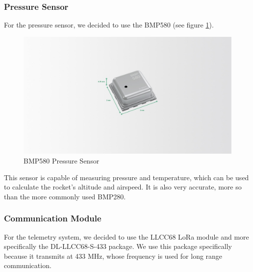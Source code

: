 \documentclass{article}
\begin{document}
\subsubsection*{Pressure Sensor}
For the pressure sensor, we decided to use the BMP580 (see figure \ref{fig:bmp580}).
\begin{figure}[p]
      \caption{BMP580 Pressure Sensor\cite{BMP580}}
      \label{fig:bmp580}
      \centering
      \includegraphics[width=\textwidth]{bmp580.jpg}
\end{figure}This sensor is capable of measuring pressure and temperature, which can be used to calculate the rocket's altitude and airspeed. It is also very accurate, more so than the more commonly used BMP280. \cite{Bosch_Sensortec_2024}

\subsubsection{Communication Module}
For the telemetry system, we decided to use the LLCC68 LoRa module and more specifically the DL-LLCC68-S-433 package. We use this package specifically because it transmits at 433 MHz, whose frequency is used for long range communication.
\end{document}
